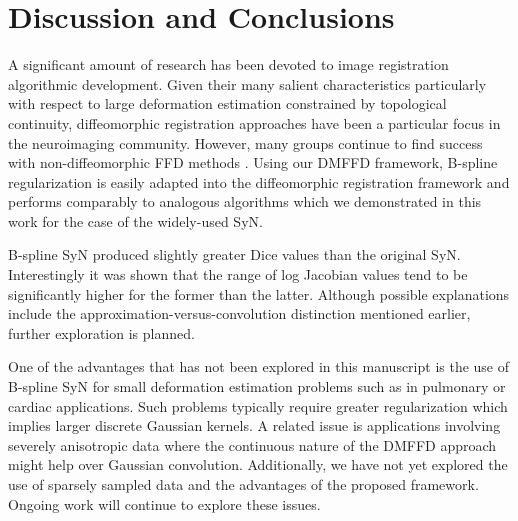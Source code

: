 \documentclass{frontiersSCNS}
\begin{document}
\section{Discussion and Conclusions}

A significant amount of research has been devoted to image registration
algorithmic development.  Given their many salient characteristics particularly with
respect to large deformation estimation constrained by topological 
continuity, diffeomorphic registration
approaches have been a particular focus in the neuroimaging community.
However, many groups continue to find success with non-diffeomorphic
FFD methods
\citep[e.g.][]{rueckert1999,klein2010}.  Using our DMFFD framework, 
B-spline regularization is easily adapted into the diffeomorphic registration 
framework and performs comparably to analogous algorithms which we demonstrated 
in this work for the case of the widely-used SyN.

B-spline SyN produced slightly greater Dice values than the original SyN.
Interestingly it was shown that the range of log Jacobian values tend to be
significantly higher for the former than the latter.  Although possible 
explanations include the approximation-versus-convolution distinction mentioned
earlier, further exploration is planned.  


One of the advantages that has not been explored in this manuscript is 
the use of B-spline SyN for small deformation estimation problems such 
as in pulmonary or cardiac applications.  Such problems typically require
greater regularization which implies larger discrete Gaussian kernels.
A related issue is applications involving severely anisotropic data where
the continuous nature of the DMFFD approach might help over Gaussian convolution.
Additionally, we have not yet explored the use of sparsely sampled data 
and the advantages of the proposed framework.
Ongoing work will continue to explore these issues.




\end{document}
